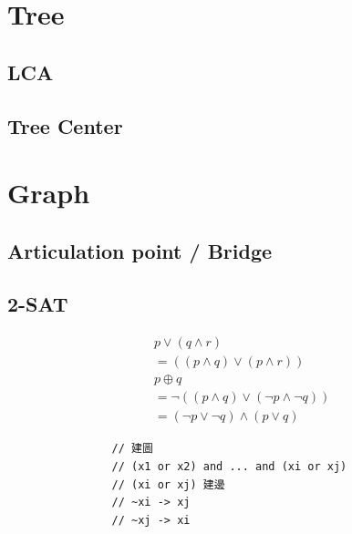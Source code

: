 \documentclass[10pt,oneside]{article}
\begin{document}
\begin{landscape}
\begin{multicols}{2}
				
				\section{Tree}
				
				\subsection{LCA}
				
				\subsection{Tree Center}
				
				
				
				\section{Graph}
				
				\subsection{Articulation point / Bridge}
				
				\subsection{2-SAT}
				
				{\normalsize 
					\begin{align*}
					&p \lor (q \land r)  \\
					&= ((p \land q) \lor (p \land r)) \\
					&p \oplus q   \\
					&= \lnot ( (p \land q) \lor (\lnot p \land \lnot q))     \\
					&= (\lnot p \lor \lnot q) \land (p \lor q)    
					\end{align*}
				}
				
				\begin{verbatim}
				// 建圖
				// (x1 or x2) and ... and (xi or xj)
				// (xi or xj) 建邊
				// ~xi -> xj
				// ~xj -> xi
				

\end{verbatim}
\end{multicols}
\end{landscape}
\end{document}
